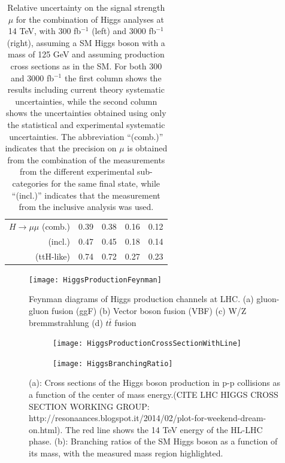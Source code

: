 \documentclass[a4paper,twoside,12pt]{book}
\begin{document}
\begin{table} [h]
{\begin{tabu}{| r | c | c | c | c |}
$H \rightarrow \mu\mu$ (comb.) & 0.39 & 0.38 & 0.16 & 0.12 \\
(incl.) & 0.47 & 0.45 & 0.18 & 0.14 \\
(ttH-like) & 0.74 & 0.72 & 0.27 & 0.23 \\ \hline            
       	\end{tabu}}
	\caption{Relative uncertainty on the signal strength $\mu$ for the combination of Higgs analyses at 14 TeV,
with 300 fb$^{-1}$ (left) and 3000 fb$^{-1}$ (right), assuming a SM Higgs boson with a mass of 125 GeV and
assuming production cross sections as in the SM. For both 300 and 3000 fb$^{-1}$ the first column shows
the results including current theory systematic uncertainties, while the second column shows the uncertainties obtained using only the statistical and experimental systematic uncertainties. The abbreviation
“(comb.)” indicates that the precision on $\mu$ is obtained from the combination of the measurements from
the different experimental sub-categories for the same final state, while “(incl.)” indicates that the measurement from the inclusive analysis was used\cite{higgsCouplings}.}
	\label{tab:HiggsTable}
	\end{table}

\begin{figure} [h]
	\centering
	\texttt{[image: HiggsProductionFeynman]}
	\caption{Feynman diagrams of Higgs production channels at LHC\cite{HiggsFeynman}. (a) gluon-gluon fusion (ggF) (b) Vector boson fusion (VBF) (c) W/Z bremmstrahlung (d) $t\bar{t}$ fusion}
	\label{fig:HiggsProductionFeynman}
\end{figure}


\begin{figure}
\centering
\begin{subfigure}{.5\textwidth}
  \centering
  \texttt{[image: HiggsProductionCrossSectionWithLine]}
  \caption{}
  \label{fig:HiggsProductionCrossSection}
\end{subfigure}%
\begin{subfigure}{.5\textwidth}
  \centering
  \texttt{[image: HiggsBranchingRatio]}
  \caption{}
  \label{fig:HiggsBranchingRatio}
\end{subfigure}
\caption{(a): Cross sections of the Higgs boson production in p-p collisions as a function of the center of mass energy.(CITE LHC HIGGS CROSS SECTION WORKING GROUP: http://resonaances.blogspot.it/2014/02/plot-for-weekend-dream-on.html). The red line
shows the 14 TeV energy of the HL-LHC phase. (b): Branching
ratios of the SM Higgs boson as a function of its mass, with the measured mass region highlighted.}
\label{fig:test}
\end{figure}
\end{document}
